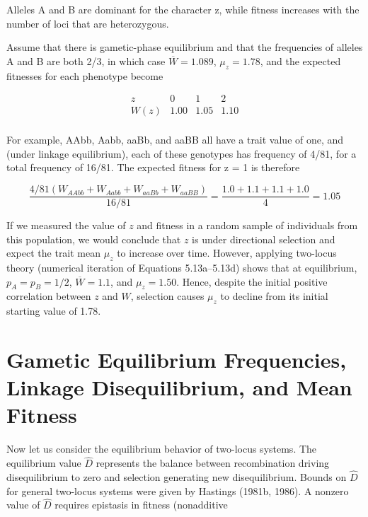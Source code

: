 \documentclass{article}
\begin{document}
Alleles A and B are dominant for the character z, while fitness increases with the number of loci that are heterozygous.

Assume that there is gametic-phase equilibrium and that the frequencies of alleles A and B are both 2/3, in which case  $ \overline{W} = 1.089 $,  $ \mu_z = 1.78 $, and the expected fitnesses for each phenotype become

\begin{equation}
\begin{array}{cccc}{{{z}}}&{{{0}}}&{{{1}}}&{{{2}}} \\{{{W(z)}}}&{{{1.00}}}&{{{1.05}}}&{{{1.10}}} \\\end{array}
\end{equation}

For example, AAbb, Aabb, aaBb, and aaBB all have a trait value of one, and (under linkage equilibrium), each of these genotypes has frequency of 4/81, for a total frequency of 16/81. The expected fitness for z = 1 is therefore

\begin{equation}
\frac{4/81\left(W_{AAbb}+W_{Aabb}+W_{aaBb}+W_{aaBB}\right)}{16/81}=\frac{1.0+1.1+1.1+1.0}{4}=1.05
\end{equation}

If we measured the value of $z$ and fitness in a random sample of individuals from this population, we would conclude that $z$ is under directional selection and expect the trait mean $\mu_z$ to increase over time. However, applying two-locus theory (numerical iteration of Equations 5.13a–5.13d) shows that at equilibrium, $p_A = p_B = 1/2$, $\overline{W} = 1.1$, and $\mu_z = 1.50$. Hence, despite the initial positive correlation between $z$ and $W$, selection causes $\mu_z$ to decline from its initial starting value of 1.78.

\section{Gametic Equilibrium Frequencies, Linkage Disequilibrium, and Mean Fitness}
Now let us consider the equilibrium behavior of two-locus systems. The equilibrium value  $ \widehat{D} $ represents the balance between recombination driving disequilibrium to zero and selection generating new disequilibrium. Bounds on  $ \widehat{D} $ for general two-locus systems were given by Hastings (1981b, 1986). A nonzero value of  $ \widehat{D} $ requires epistasis in fitness (nonadditive
\end{document}
